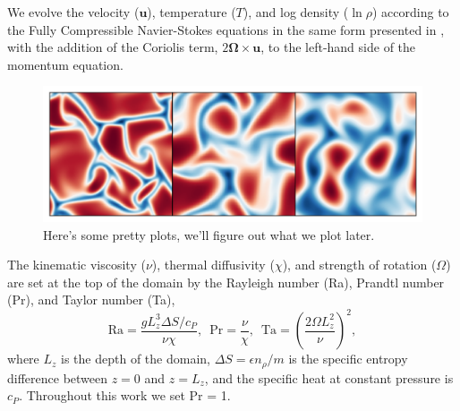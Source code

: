 \documentclass[twocolumn, amsmath, amsfonts, amssymb]{aastex62}
\begin{document}
We evolve the velocity ($\bm{u}$), temperature ($T$), and log density ($\ln\rho$) according to the
Fully Compressible Navier-Stokes equations in the same form presented in \AB, with the
addition of the Coriolis term, $2\bm{\Omega}\times\bm{u}$, to the left-hand side
of the momentum equation.

\begin{figure}[t!]
\includegraphics[width=\textwidth]{./figs/dynamics_plot.png}
\caption{ Here's some pretty plots, we'll figure out what we plot later.
\label{fig:pretty_convection} }
\end{figure}


The kinematic viscosity ($\nu$), thermal diffusivity ($\chi$), and strength of
rotation ($\Omega$) are set at the top of the domain by the Rayleigh number
(Ra), Prandtl number (Pr), and Taylor number (Ta),
\begin{equation}
\text{Ra} = \frac{g L_z^3 \Delta S / c_P}{\nu \chi}, \,\,\,
\text{Pr} = \frac{\nu}{\chi}, \,\,\,
\text{Ta} = \left(\frac{2 \Omega L_z^2}{\nu}\right)^2,
\end{equation}
where $L_z$ is the depth of the domain, 
$\Delta S = \epsilon n_\rho / m$ is the specific entropy difference between
$z = 0$ and $z = L_z$, and the specific heat at constant pressure is $c_P$.
Throughout this work we set Pr = 1.
\end{document}
